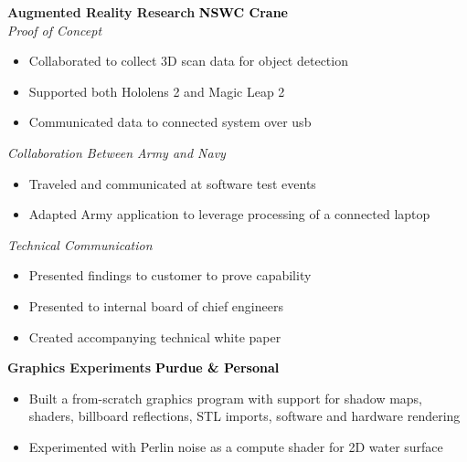 \documentclass[9pt]{developercv} %
\begin{document}
\begin{minipage}[t]{.46\textwidth} %
	\textbf{Augmented Reality Research}
	\hfill%
	{\footnotesize \textbf{\textcolor{black}{NSWC Crane}}}
	\\
	\textit{Proof of Concept}
	\begin{itemize}[noitemsep,topsep=0pt]
		\setlength\itemsep{0pt}
		\item[$\ast$] Collaborated to collect 3D scan data for object detection
		\item[$\ast$] Supported both Hololens 2 and Magic Leap 2
		\item[$\ast$] Communicated data to connected system over usb
	\end{itemize}
	\textit{Collaboration Between Army and Navy}
	\begin{itemize}[noitemsep,topsep=0pt]
		\setlength\itemsep{0pt}
		\item[$\ast$] Traveled and communicated at software test events
		\item[$\ast$] Adapted Army application to leverage processing of a connected laptop
	\end{itemize}
	\textit{Technical Communication}
	\begin{itemize}[noitemsep,topsep=0pt]
		\setlength\itemsep{0pt}
		\item[$\ast$] Presented findings to customer to prove capability
		\item[$\ast$] Presented to internal board of chief engineers 
		\item[$\ast$] Created accompanying technical white paper
	\end{itemize}
\end{minipage}
\begin{minipage}[t]{1\textwidth} %
	\vspace{\baselineskip}
	\textbf{Graphics Experiments}
	\hfill%
	{\footnotesize \textbf{\textcolor{black}{Purdue \& Personal}}}
	\begin{itemize}[noitemsep,topsep=0pt]
		\setlength\itemsep{0pt}
		\item[$\ast$]Built a from-scratch graphics program with support for shadow maps, shaders,
		billboard reflections, STL imports, software and hardware rendering
		\item[$\ast$]Experimented with Perlin noise as a compute shader for 2D water surface
	\end{itemize}
\end{minipage}
\end{document}
